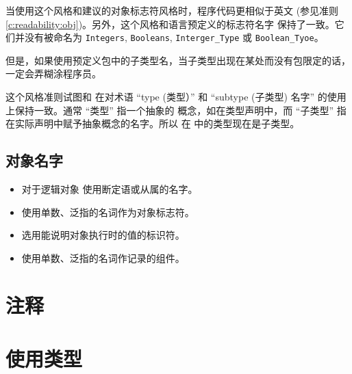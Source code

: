 \begin{blockindent}
当使用这个风格和建议的对象标志符风格时，程序代码更相似于英文
(参见准则\ref{c:readability:obj})。另外，这个风格和语言预定义的标志符名字
保持了一致。它们并没有被命名为 \texttt{Integers}, \texttt{Booleans},
\texttt{Interger\_Type} 或 \texttt{Boolean\_Tyoe}。

但是，如果使用预定义包中的子类型名，当子类型出现在某处而没有包限定的话，
一定会弄糊涂程序员。
\end{blockindent}

\begin{blockindent}
这个风格准则试图和 \cite{arm95} 在对术语 ``type (类型）''
和 ``subtype (子类型) 名字'' 的使用上保持一致。通常 ``类型'' 指一个抽象的
概念，如在类型声明中，而 ``子类型'' 指在实际声明中赋予抽象概念的名字。所以
在 \cite{arm83} 中的类型现在是子类型。
\end{blockindent}

\subsection{对象名字}
\begin{itemize}
    \item 对于逻辑对象 使用断定语或从属的名字。
    \item 使用单数、泛指的名词作为对象标志符。
    \item 选用能说明对象执行时的值的标识符。
    \item 使用单数、泛指的名词作记录的组件。
\end{itemize}

\section{注释}

\section{使用类型}

